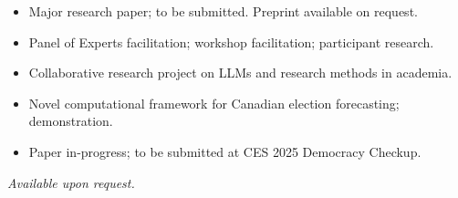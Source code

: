 
\begin{itemize}
    \item Major research paper; to be submitted. Preprint available on request.
\end{itemize}

\begin{itemize}
    \item Panel of Experts facilitation; workshop facilitation; participant research.
\end{itemize}

\begin{itemize}
    \item Collaborative research project on LLMs and research methods in academia.
\end{itemize}

\begin{itemize}
    \item Novel computational framework for Canadian election forecasting; demonstration.
\end{itemize}

\begin{itemize}
    \item Paper in-progress; to be submitted at CES 2025 Democracy Checkup.
\end{itemize}

\emph{Available upon request.}


